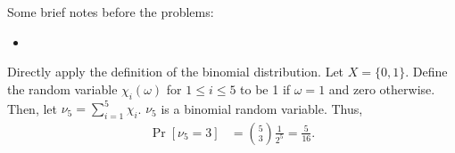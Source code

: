 Some brief notes before the problems:
\begin{itemize}
    \item \color{brickred}{Koralov and Sinai use $\times$ instead of $\otimes$ for the product $\sigma$-algebra. Moving forward, the reader needs to be cautious about what the operands are. For if they are $\sigma$-algebras, we understand the result of the expression to be the aforementioned product.} 
\end{itemize}
\begin{problem}{1}
\end{problem}
\begin{solution}
    Directly apply the definition of the binomial distribution. Let $X = \{0,1\}$. Define the random variable $\chi_i(\omega)$ for $1\leq i\leq 5$ to be 1 if $\omega = 1$ and zero otherwise. Then, let $\nu_5 = \sum_{i=1}^5 \chi_i$. $\nu_5$ is a binomial random variable. Thus,
    \begin{align*}
        \Pr[\nu_5 = 3] &= \binom{5}{3} \frac{1}{2^5} = \frac{5}{16}.
    \end{align*}
\end{solution}
\begin{problem}{2}
\end{problem}
